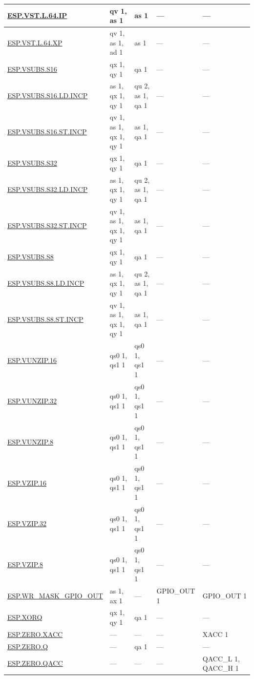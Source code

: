 \begin{longtable}[c]{|l|m{2.5cm}|m{2.5cm}|m{2.5cm}|m{2.5cm}|}
    \hyperref[instruction:ESPVSTL64IP]{ESP.VST.L.64.IP} & qv 1, as 1 & as 1 & — & — \\\hline
    \hyperref[instruction:ESPVSTL64XP]{ESP.VST.L.64.XP} & qv 1, as 1, ad 1 & as 1 & — & — \\\hline
    \hyperref[instruction:ESPVSUBSS16]{ESP.VSUBS.S16} & qx 1, qy 1 & qa 1 & — & — \\\hline
    \hyperref[instruction:ESPVSUBSS16LDINCP]{ESP.VSUBS.S16.LD.INCP} & as 1, qx 1, qy 1 & qu 2, as 1, qa 1 & — & — \\\hline
    \hyperref[instruction:ESPVSUBSS16STINCP]{ESP.VSUBS.S16.ST.INCP} & qv 1, as 1, qx 1, qy 1 & as 1, qa 1 & — & — \\\hline
    \hyperref[instruction:ESPVSUBSS32]{ESP.VSUBS.S32} & qx 1, qy 1 & qa 1 & — & — \\\hline
    \hyperref[instruction:ESPVSUBSS32LDINCP]{ESP.VSUBS.S32.LD.INCP} & as 1, qx 1, qy 1 & qu 2, as 1, qa 1 & — & — \\\hline
    \hyperref[instruction:ESPVSUBSS32STINCP]{ESP.VSUBS.S32.ST.INCP} & qv 1, as 1, qx 1, qy 1 & as 1, qa 1 & — & — \\\hline
    \hyperref[instruction:ESPVSUBSS8]{ESP.VSUBS.S8} & qx 1, qy 1 & qa 1 & — & — \\\hline
    \hyperref[instruction:ESPVSUBSS8LDINCP]{ESP.VSUBS.S8.LD.INCP} & as 1, qx 1, qy 1 & qu 2, as 1, qa 1 & — & — \\\hline
    \hyperref[instruction:ESPVSUBSS8STINCP]{ESP.VSUBS.S8.ST.INCP} & qv 1, as 1, qx 1, qy 1 & as 1, qa 1 & — & — \\\hline
    \hyperref[instruction:ESPVUNZIP16]{ESP.VUNZIP.16} & qs0 1, qs1 1 & qs0 1, qs1 1 & — & — \\\hline
    \hyperref[instruction:ESPVUNZIP32]{ESP.VUNZIP.32} & qs0 1, qs1 1 & qs0 1, qs1 1 & — & — \\\hline
    \hyperref[instruction:ESPVUNZIP8]{ESP.VUNZIP.8} & qs0 1, qs1 1 & qs0 1, qs1 1 & — & — \\\hline
    \hyperref[instruction:ESPVZIP16]{ESP.VZIP.16} & qs0 1, qs1 1 & qs0 1, qs1 1 & — & — \\\hline
    \hyperref[instruction:ESPVZIP32]{ESP.VZIP.32} & qs0 1, qs1 1 & qs0 1, qs1 1 & — & — \\\hline
    \hyperref[instruction:ESPVZIP8]{ESP.VZIP.8} & qs0 1, qs1 1 & qs0 1, qs1 1 & — & — \\\hline
    \hyperref[instruction:ESPWRMASKGPIOOUT]{ESP.WR\_MASK\_GPIO\_OUT} & as 1, ax 1 & — & GPIO\_OUT 1 & GPIO\_OUT 1 \\\hline
    \hyperref[instruction:ESPXORQ]{ESP.XORQ} & qx 1, qy 1 & qa 1 & — & — \\\hline
    \hyperref[instruction:ESPZEROXACC]{ESP.ZERO.XACC} & — & — & — & XACC 1\\\hline
    \hyperref[instruction:ESPZEROQ]{ESP.ZERO.Q} & — & qa 1 & — & — \\\hline
    \hyperref[instruction:ESPZEROQACC]{ESP.ZERO.QACC} & — & — & — & QACC\_L 1, QACC\_H 1\\\hline
\end{longtable}